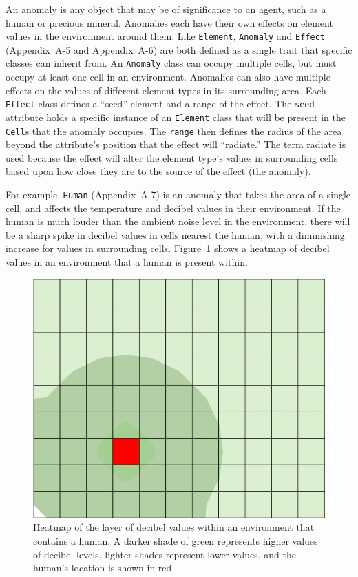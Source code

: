An anomaly is any object that may be of significance to an agent, such as a human or precious mineral.
Anomalies each have their own effects on element values in the environment around them.
Like \texttt{Element}, \texttt{Anomaly} and \texttt{Effect} (Appendix~A-5 and Appendix~A-6) are both defined as a single trait that specific classes can inherit from.
An \texttt{Anomaly} class can occupy multiple cells, but must occupy at least one cell in an environment.
Anomalies can also have multiple effects on the values of different element types in its surrounding area.
Each \texttt{Effect} class defines a ``seed'' element and a range of the effect.
The \texttt{seed} attribute holds a specific instance of an \texttt{Element} class that will be present in the \texttt{Cell}s that the anomaly occupies.
The \texttt{range} then defines the radius of the area beyond the attribute's position that the effect will ``radiate.''
The term radiate is used because the effect will alter the element type's values in surrounding cells based upon how close they are to the source of the effect (the anomaly).

For example, \texttt{Human} (Appendix~A-7) is an anomaly that takes the area of a single cell, and affects the temperature and decibel values in their environment.
If the human is much louder than the ambient noise level in the environment, there will be a sharp spike in decibel values in cells nearest the human, with a diminishing increase for values in surrounding cells.
Figure~\ref{fig:human_decibel_effect} shows a heatmap of decibel values in an environment that a human is present within.

\begin{figure}[H]
  \centering
  \includegraphics[width=0.6\columnwidth]{Figures/human_decibel_effect.JPG}
  \caption[Sound Effect Heatmap]{Heatmap of the layer of decibel values within an environment that contains a human. A darker shade of green represents higher values of decibel levels, lighter shades represent lower values, and the human's location is shown in red.}
  \label{fig:human_decibel_effect}
\end{figure}

